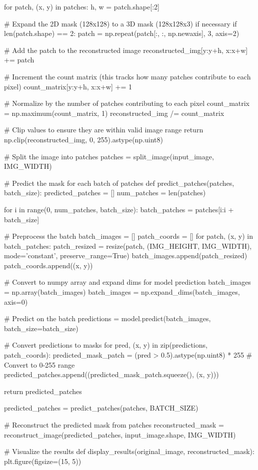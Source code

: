 \documentclass[conference]{IEEEtran}
\begin{document}
for patch, (x, y) in patches:
h, w = patch.shape[:2]

# Expand the 2D mask (128x128) to a 3D mask (128x128x3) if necessary
if len(patch.shape) == 2:
patch = np.repeat(patch[:, :, np.newaxis], 3, axis=2)

# Add the patch to the reconstructed image
reconstructed_img[y:y+h, x:x+w] += patch

# Increment the count matrix (this tracks how many patches contribute to each pixel)
count_matrix[y:y+h, x:x+w] += 1

# Normalize by the number of patches contributing to each pixel
count_matrix = np.maximum(count_matrix, 1)
reconstructed_img /= count_matrix

# Clip values to ensure they are within valid image range
return np.clip(reconstructed_img, 0, 255).astype(np.uint8)

# Split the image into patches
patches = split_image(input_image, IMG_WIDTH)

# Predict the mask for each batch of patches
def predict_patches(patches, batch_size):
predicted_patches = []
num_patches = len(patches)

for i in range(0, num_patches, batch_size):
batch_patches = patches[i:i + batch_size]

# Preprocess the batch
batch_images = []
patch_coords = []
for patch, (x, y) in batch_patches:
patch_resized = resize(patch, (IMG_HEIGHT, IMG_WIDTH), mode='constant', preserve_range=True)
batch_images.append(patch_resized)
patch_coords.append((x, y))

# Convert to numpy array and expand dims for model prediction
batch_images = np.array(batch_images)
batch_images = np.expand_dims(batch_images, axis=0)

# Predict on the batch
predictions = model.predict(batch_images, batch_size=batch_size)

# Convert predictions to masks
for pred, (x, y) in zip(predictions, patch_coords):
predicted_mask_patch = (pred > 0.5).astype(np.uint8) * 255  # Convert to 0-255 range
predicted_patches.append((predicted_mask_patch.squeeze(), (x, y)))

return predicted_patches

predicted_patches = predict_patches(patches, BATCH_SIZE)

# Reconstruct the predicted mask from patches
reconstructed_mask = reconstruct_image(predicted_patches, input_image.shape, IMG_WIDTH)

# Visualize the results
def display_results(original_image, reconstructed_mask):
plt.figure(figsize=(15, 5))
\end{document}
